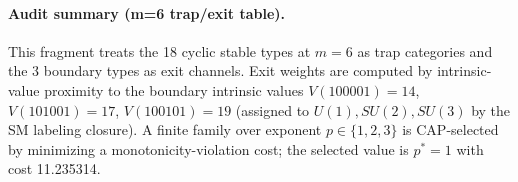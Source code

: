 \paragraph{Audit summary (m=6 trap/exit table).} \AuditTag This fragment treats the 18 cyclic stable types at $m=6$ as trap categories and the 3 boundary types as exit channels. Exit weights are computed by intrinsic-value proximity to the boundary intrinsic values $V(100001)=14$, $V(101001)=17$, $V(100101)=19$ (assigned to $U(1),SU(2),SU(3)$ by the SM labeling closure). A finite family over exponent $p\in\{1,2,3\}$ is CAP-selected by minimizing a monotonicity-violation cost; the selected value is $p^\ast=1$ with cost 11.235314.